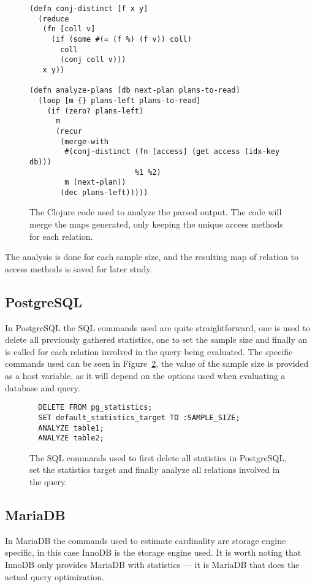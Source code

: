 \begin{figure}[ht]
\begin{verbatim}
(defn conj-distinct [f x y]
  (reduce
   (fn [coll v]
     (if (some #(= (f %) (f v)) coll)
       coll
       (conj coll v)))
   x y))

(defn analyze-plans [db next-plan plans-to-read]
  (loop [m {} plans-left plans-to-read]
    (if (zero? plans-left)
      m
      (recur
       (merge-with
        #(conj-distinct (fn [access] (get access (idx-key db)))
                        %1 %2)
        m (next-plan))
       (dec plans-left)))))
   \end{verbatim}
   \caption[The Clojure code to analyze a query]{The Clojure code used to
     analyze the parsed output. The code will merge the maps generated, only
     keeping the unique access methods for each relation.}
\label{fig:clj:analyzing}
\end{figure}

The analysis is done for each sample size, and the resulting map of relation to
access methods is saved for later study.

\subsection{PostgreSQL}\label{sec:postgresql}
In PostgreSQL the SQL commands used are quite straightforward, one is used to
delete all previously gathered statistics, one to set the sample size and
finally an  is called for each relation involved in the query being
evaluated. The specific commands used can be seen in
Figure~\ref{fig:sql:pganalyze}, the value of the sample size is provided as a
host variable, as it will depend on the options used when evaluating a database
and query.

\begin{figure}[ht]
\begin{verbatim}
  DELETE FROM pg_statistics;
  SET default_statistics_target TO :SAMPLE_SIZE;
  ANALYZE table1;
  ANALYZE table2;
\end{verbatim}
\caption[Generating new cardinality estimates in PostgreSQL.]{The SQL commands
  used to first delete all statistics in PostgreSQL, set the statistics target
  and finally analyze all relations involved in the query.}
\label{fig:sql:pganalyze}
\end{figure}

\subsection{MariaDB}\label{sec:mariadb}
In MariaDB the commands used to estimate cardinality are storage engine specific,
in this case InnoDB is the storage engine used. It is worth noting that InnoDB only
provides MariaDB with statistics --- it is MariaDB that does the actual
query optimization.

